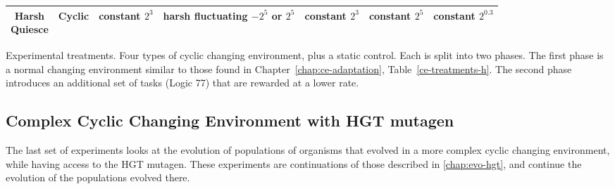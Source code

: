 \documentclass[PhD]{msu-thesis}
\begin{document}
\begin{table}[]
\begin{tabular}{|c|c||c|c||c|c|c|}
	\makecell{Harsh \\ Quiesce} & Cyclic & \makecell{constant \\ $2^3$} & \makecell{harsh \\ fluctuating \\ $-2^5$ or $2^5$} & \makecell{constant \\ $2^3$} & \makecell{constant \\ $2^5$} & \makecell{constant \\ $2^{0.3}$} \\\hline
	\end{tabular} 

	\begin{flushleft} Experimental treatments. Four types of cyclic changing environment, plus a static control. Each is split into two phases. The first phase is a normal changing environment similar to those found in Chapter~\ref{chap:ce-adaptation}, Table~\ref{ce-treatments-h}. The second phase introduces an additional set of tasks (Logic 77) that are rewarded at a lower rate.
	\end{flushleft}
	\label{cel-treatments}
	\end{table}


\subsection{Complex Cyclic Changing Environment with HGT mutagen}
The last set of experiments looks at the evolution of populations of organisms that evolved in a more complex cyclic changing environment, while having access to the HGT mutagen. These experiments are continuations of those described in \ref{chap:evo-hgt}, and continue the evolution of the populations evolved there.
\end{document}
